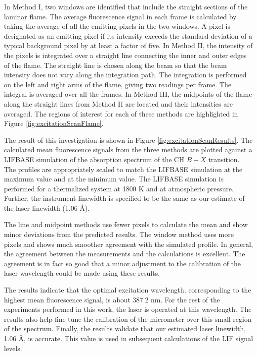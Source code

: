 In Method I, two windows are identified that include the straight sections of the laminar flame.
The average fluorescence signal in each frame is calculated by taking the average of all the emitting pixels in the two windows.
A pixel is designated as an emitting pixel if its intensity exceeds the standard deviation of a typical background pixel by at least a factor of five.
In Method II, the intensity of the pixels is integrated over a straight line connecting the inner and outer edges of the flame.
The straight line is chosen along the beam so that the beam intensity does not vary along the integration path.
The integration is performed on the left and right arms of the flame, giving two readings per frame.
The integral is averaged over all the frames.
In Method III, the midpoints of the flame along the straight lines from Method II are located and their intensities are averaged.
The regions of interest for each of these methods are highlighted in Figure \ref{fig:excitationScanFlame}.

The result of this investigation is shown in Figure \ref{fig:excitationScanResults}.
The calculated mean fluorescence signals from the three methods are plotted against a LIFBASE simulation of the absorption spectrum of the CH \(B-X\) transition.
The profiles are appropriately scaled to match the LIFBASE simulation at the maximum value and at the minimum value.
The LIFBASE simulation is performed for a thermalized system at 1800 K and at atmospheric pressure.
Further, the instrument linewidth is specified to be the same as our estimate of the laser linewidth (1.06 \AA).



The line and midpoint methods use fewer pixels to calculate the mean and show minor deviations from the predicted results.
The window method uses more pixels and shows much smoother agreement with the simulated profile.
In general, the agreement between the measurements and the calculations is excellent.
The agreement is in fact so good that a minor adjustment to the calibration of the laser wavelength could be made using these results.

The results indicate that the optimal excitation wavelength, corresponding to the highest mean fluorescence signal, is about 387.2 nm.
For the rest of the experiments performed in this work, the laser is operated at this wavelength.
The results also help fine tune the calibration of the micrometer over this small region of the spectrum.
Finally, the results validate that our estimated laser linewidth, 1.06 \AA, is accurate.
This value is used in subsequent calculations of the LIF signal levels.

